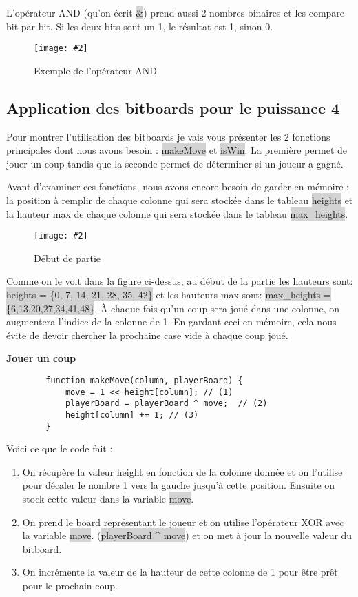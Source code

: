 \documentclass[a4paper]{article}
\newcommand{\img}[3][]{
    \begin{figure}[H]
        \centering
        \texttt{[image: \#2]}
        \caption{#1}    
    \end{figure}
}
\newcommand{\inlinecode}[1]{\colorbox{lightgray}{#1}}
\newcommand{\ptitle}[1]{\vspace{10pt}
{\large \textbf{#1}}}
\begin{document}
    L'opérateur AND (qu'on écrit \inlinecode{\&}) prend aussi 2 nombres binaires et les compare bit par bit. Si les deux bits sont un 1, le résultat est 1, sinon 0.
    \img[Exemple de l'opérateur AND]{Images/ANDExemple.png}{0.15}

\subsection{Application des bitboards pour le puissance 4}

    Pour montrer l'utilisation des bitboards je vais vous présenter les 2 fonctions principales dont nous avons besoin : \inlinecode{makeMove} et \inlinecode{isWin}. La première permet de jouer un coup tandis que la seconde permet de déterminer si un joueur a gagné.

    Avant d'examiner ces fonctions, nous avons encore besoin de garder en mémoire : la position à remplir de chaque colonne qui sera stockée dans le tableau \inlinecode{heights} et la hauteur max de chaque colonne qui sera stockée dans le tableau \inlinecode{max\_heights}.

    \img[Début de partie]{Images/EmptyBoard.png}{0.4}

    Comme on le voit dans la figure ci-dessus, au début de la partie les hauteurs sont: \newline\inlinecode{heights = \{0, 7, 14, 21, 28, 35, 42\}} et les hauteurs max sont: \inlinecode{max\_heights = \{6,13,20,27,34,41,48\}}. À chaque fois qu'un coup sera joué dans une colonne, on augmentera l'indice de la colonne de 1. En gardant ceci en mémoire, cela nous évite de devoir chercher la prochaine case vide à chaque coup joué.

    \ptitle{Jouer un coup}

    \begin{lstlisting}
        function makeMove(column, playerBoard) {
            move = 1 << height[column]; // (1)
            playerBoard = playerBoard ^ move;  // (2)
            height[column] += 1; // (3)
        }
    \end{lstlisting}

    Voici ce que le code fait : 
    \begin{enumerate}
        \item On récupère la valeur height en fonction de la colonne donnée et on l'utilise pour décaler le nombre 1 vers la gauche jusqu'à cette position. Ensuite on stock cette valeur dans la variable \inlinecode{move}.
        \item On prend le board représentant le joueur et on utilise l'opérateur XOR avec la variable \inlinecode{move}. (\inlinecode{playerBoard \^{} move}) et on met à jour la nouvelle valeur du bitboard.
        \item On incrémente la valeur de la hauteur de cette colonne de 1 pour être prêt pour le prochain coup.
    \end{enumerate}
\end{document}
